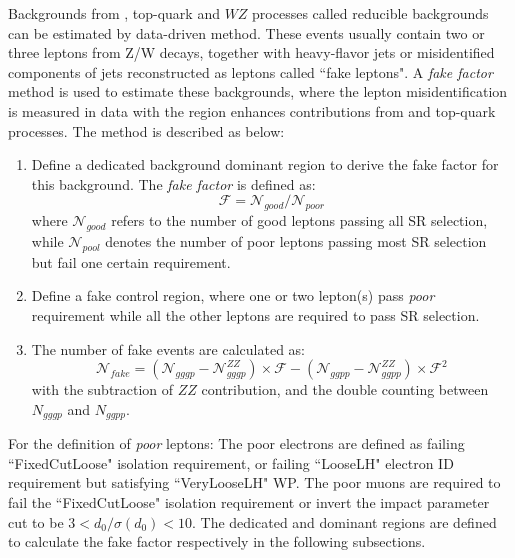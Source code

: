 Backgrounds from \Zjet, top-quark and $WZ$ processes called reducible backgrounds can be estimated by data-driven method.
These events usually contain two or three leptons from Z/W decays, together with heavy-flavor jets or misidentified components of jets reconstructed as leptons called ``fake leptons".
A \textit{fake factor} method is used to estimate these backgrounds, where the lepton misidentification is measured in data 
with the region enhances contributions from \Zjet and top-quark processes.
The method is described as below:
\begin{enumerate}
	\item Define a dedicated background dominant region to derive the fake factor for this background. 
The \textit{fake factor} is defined as:
\begin{equation}
	\mathcal{F} = \mathcal{N}_{good} / \mathcal{N}_{poor}
\end{equation}
where $\mathcal{N}_{good}$ refers to the number of good leptons passing all SR selection, while $\mathcal{N}_{pool}$ denotes the number of poor leptons passing most SR selection but fail one certain requirement.
	\item Define a fake control region, where one or two lepton(s) pass \textit{poor} requirement while all the other leptons are required to pass SR selection.
	\item The number of fake events are calculated as:
\begin{equation}
	\mathcal{N}_{fake} = \left( \mathcal{N}_{gggp} - \mathcal{N}_{gggp}^{ZZ} \right) \times \mathcal{F} - \left( \mathcal{N}_{ggpp} - \mathcal{N}_{ggpp}^{ZZ} \right) \times \mathcal{F}^{2}
\end{equation}
with the subtraction of $ZZ$ contribution, and the double counting between $N_{gggp}$ and $N_{ggpp}$.
\end{enumerate}

For the definition of \textit{poor} leptons:
The poor electrons are defined as failing ``FixedCutLoose" isolation requirement, or failing ``LooseLH" electron ID requirement but satisfying ``VeryLooseLH" WP.
The poor muons are required to fail the ``FixedCutLoose" isolation requirement or invert the impact parameter cut to be $3 < d_{0}/\sigma(d_{0}) < 10$.
The dedicated \Zjet and \ttbar dominant regions are defined to calculate the fake factor respectively in the following subsections.

